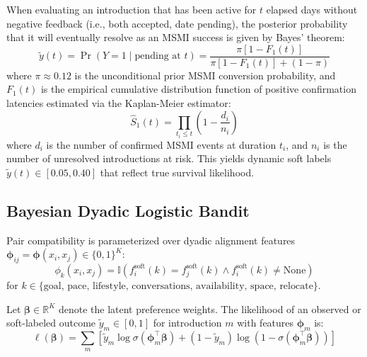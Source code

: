 \documentclass[10pt,twocolumn,letterpaper]{article}
\begin{document}
When evaluating an introduction that has been active for $t$ elapsed days without negative feedback (i.e., both accepted, date pending), the posterior probability that it will eventually resolve as an MSMI success is given by Bayes' theorem:
\begin{equation}
\label{eq:km_posterior}
\tilde{y}(t) = \Pr(Y = 1 \mid \text{pending at } t) = \frac{\pi [1 - F_1(t)]}{\pi [1 - F_1(t)] + (1 - \pi)}
\end{equation}
where $\pi \approx 0.12$ is the unconditional prior MSMI conversion probability, and $F_1(t)$ is the empirical cumulative distribution function of positive confirmation latencies estimated via the Kaplan-Meier estimator:
\begin{equation}
\label{eq:km_estimator}
\hat{S}_1(t) = \prod_{t_i \le t} \left(1 - \frac{d_i}{n_i}\right)
\end{equation}
where $d_i$ is the number of confirmed MSMI events at duration $t_i$, and $n_i$ is the number of unresolved introductions at risk. This yields dynamic soft labels $\tilde{y}(t) \in [0.05, 0.40]$ that reflect true survival likelihood.

\subsection{Bayesian Dyadic Logistic Bandit}
Pair compatibility is parameterized over dyadic alignment features $\boldsymbol{\phi}_{ij} = \boldsymbol{\phi}(x_i, x_j) \in \{0, 1\}^K$:
\begin{equation}
\phi_k(x_i, x_j) = \mathbb{I}\left(f_i^{\text{soft}}(k) = f_j^{\text{soft}}(k) \wedge f_i^{\text{soft}}(k) \ne \text{None}\right)
\end{equation}
for $k \in \{\text{goal, pace, lifestyle, conversations, availability, space, relocate}\}$.

Let $\boldsymbol{\beta} \in \mathbb{R}^K$ denote the latent preference weights. The likelihood of an observed or soft-labeled outcome $\tilde{y}_m \in [0, 1]$ for introduction $m$ with features $\boldsymbol{\phi}_m$ is:
\begin{equation}
\ell(\boldsymbol{\beta}) = \sum_m \left[ \tilde{y}_m \log \sigma(\boldsymbol{\phi}_m^\top \boldsymbol{\beta}) + (1 - \tilde{y}_m) \log(1 - \sigma(\boldsymbol{\phi}_m^\top \boldsymbol{\beta})) \right]
\end{equation}
\end{document}
